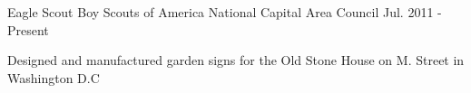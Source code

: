

\begin{cventries}

  \cventry
  {Eagle Scout} %
  {Boy Scouts of America} %
  {National Capital Area Council} %
  {Jul. 2011 - Present} %
    {
      \begin{cvitems} %
      \item {Designed and manufactured garden signs for the Old Stone House on M. Street in Washington D.C}
      \end{cvitems}
    }

\end{cventries}
